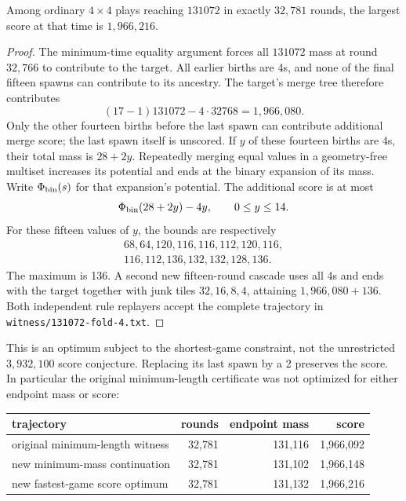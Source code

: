 \begin{theorem}\label{thm:fastscore}
Among ordinary $4\times4$ plays reaching $131072$ in exactly
$32{,}781$ rounds, the largest score at that time is $1{,}966{,}216$.
\end{theorem}
\begin{proof}
The minimum-time equality argument forces all $131072$ mass at round
$32{,}766$ to contribute to the target. All earlier births are 4s, and
none of the final fifteen spawns can contribute to its ancestry.
The target's merge tree therefore contributes
\[
 (17-1)131072-4\cdot32768=1{,}966{,}080.
\]
Only the other fourteen births before the last spawn can contribute
additional merge score; the last spawn itself is unscored. If $y$ of
these fourteen births are 4s, their total mass is $28+2y$. Repeatedly
merging equal values in a geometry-free multiset increases its potential
and ends at the binary expansion of its mass. Write $\Phi_{\rm bin}(s)$
for that expansion's potential. The additional score is at most
\[
 \Phi_{\rm bin}(28+2y)-4y,\qquad 0\le y\le14.
\]
For these fifteen values of $y$, the bounds are respectively
\[
\begin{gathered}
68,64,120,116,116,112,120,116,\\
116,112,136,132,132,128,136.
\end{gathered}
\]
The maximum is 136. A second new fifteen-round cascade uses all 4s
and ends with the target together with junk tiles $32,16,8,4$,
attaining $1{,}966{,}080+136$. Both independent rule replayers accept
the complete trajectory in \texttt{witness/131072-fold-4.txt}.
\end{proof}

This is an optimum subject to the shortest-game constraint, not the
unrestricted $3{,}932{,}100$ score conjecture. Replacing its last spawn
by a 2 preserves the score. In particular the original minimum-length
certificate was not optimized for either endpoint mass or score:
\begin{center}\small
\begin{tabular}{@{}lrrr@{}}
\toprule
trajectory & rounds & endpoint mass & score\\
\midrule
original minimum-length witness & 32{,}781 & 131{,}116 & 1{,}966{,}092\\
new minimum-mass continuation & 32{,}781 & 131{,}102 & 1{,}966{,}148\\
new fastest-game score optimum & 32{,}781 & 131{,}132 & 1{,}966{,}216\\
\bottomrule
\end{tabular}
\end{center}

